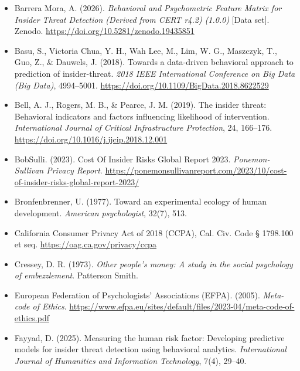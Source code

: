 \documentclass[IB]{TFUOC}%
\begin{document}
\begin{itemize}
    \item Barrera Mora, A. (2026). \textit{Behavioral and Psychometric Feature Matrix for Insider Threat Detection (Derived from CERT r4.2) (1.0.0)} [Data set]. Zenodo. \url{https://doi.org/10.5281/zenodo.19435851}

    \item Basu, S., Victoria Chua, Y. H., Wah Lee, M., Lim, W. G., 
    Maszczyk, T., Guo, Z., \& Dauwels, J. (2018). Towards a data-driven 
    behavioral approach to prediction of insider-threat. \textit{2018 IEEE 
    International Conference on Big Data (Big Data)}, 4994--5001. 
    \url{https://doi.org/10.1109/BigData.2018.8622529}

    \item Bell, A. J., Rogers, M. B., \& Pearce, J. M. (2019). The insider 
    threat: Behavioral indicators and factors influencing likelihood of 
    intervention. \textit{International Journal of Critical Infrastructure 
    Protection}, 24, 166--176. 
    \url{https://doi.org/10.1016/j.ijcip.2018.12.001}

    \item BobSulli. (2023). Cost Of Insider Risks Global Report 2023. \textit{Ponemon-Sullivan Privacy Report}. \url{https://ponemonsullivanreport.com/2023/10/cost-of-insider-risks-global-report-2023/}

    \item Bronfenbrenner, U. (1977). Toward an experimental ecology of human development. \textit{American psychologist}, 32(7), 513.

    \item California Consumer Privacy Act of 2018 (CCPA), Cal. Civ. Code § 1798.100 et seq. \url{https://oag.ca.gov/privacy/ccpa}

    \item Cressey, D. R. (1973). \textit{Other people's money: A study in 
    the social psychology of embezzlement}. Patterson Smith.

    \item European Federation of Psychologists' Associations (EFPA). (2005). \textit{Meta-code of Ethics}.
    \url{https://www.efpa.eu/sites/default/files/2023-04/meta-code-of-ethics.pdf}

    \item Fayyad, D. (2025). Measuring the human risk factor: Developing 
    predictive models for insider threat detection using behavioral analytics. 
    \textit{International Journal of Humanities and Information Technology}, 
    7(4), 29--40.


\end{itemize}
\end{document}
